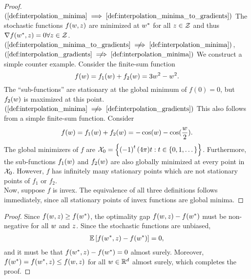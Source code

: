 \interpRelationships*
\begin{proof}
    \( (\autoref{def:interpolation_minima} \implies \autoref{def:interpolation_minima_to_gradients}) \)
    The stochastic functions \( f(w,z) \) are minimized at \( w^* \) for all \( z \in \mathcal{Z} \) and thus \( \nabla f(w^*, z) = 0 \forall z \in \mathcal{Z} \).\\

    \( (\autoref{def:interpolation_minima_to_gradients} \centernot \implies \autoref{def:interpolation_minima}) \), \(
    (\autoref{def:interpolation_gradients} \centernot \implies \autoref{def:interpolation_minima}) \)
    We construct a simple counter example.
    Consider the finite-sum function
    \[ f(w) = f_1(w) + f_2(w) = 3w^2 - w^2. \]
    The ``sub-functions'' are stationary at the global minimum of \( f(0) = 0 \), but \( f_2(w) \) is maximized at this point.\\

    \( (\autoref{def:interpolation_minima} \centernot \implies \autoref{def:interpolation_gradients}) \) This also follows from a simple finite-sum function.
    Consider
    \[ f(w) = f_1(w) + f_2(w) = - \cos(w) - \cos(\frac{w}{2}). \]
    The global minimizers of \( f \) are \(\mathcal{X}_0 = \left\{\left(-1\right)^{t} (4\pi) t : t \in \left\{0,1, \dots \right\}\right\} \).
    Furthermore, the sub-functions \( f_1(w) \) and \( f_2(w) \) are also globally minimized at every point in \( \mathcal{X}_0 \).
    However, \( f \) has infinitely many stationary points which are not stationary points of \( f_1 \) or \( f_2 \).\\

    Now, suppose \( f \) is invex. The equivalence of all three definitions follows immediately, since all stationary points of invex functions are global minima.
\end{proof}

\boundedBelow*
\begin{proof}
    Since \( f(w, z ) \geq f(w^*) \), the optimality gap \( f(w,z) - f(w^*) \) must be non-negative for all \( w \) and \( z \).
    Since the stochastic functions are unbiased,
    \begin{align*}
        \mathbb{E} \left[f(w^*,z) - f(w^*)\right] = 0,
    \end{align*}
    and it must be that \( f(w^*,z) - f(w^*) = 0 \) almost surely.
    Moreover, \( f(w^*) = f(w^*,z) \leq f(w, z) \) for all \( w \in \mathbb{R}^d \) almost surely, which completes the proof.
\end{proof}


